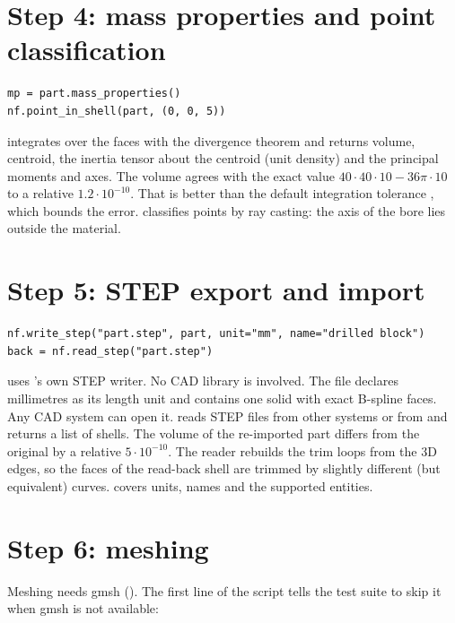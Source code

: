 \section{Step 4: mass properties and point classification}\label{sec:qs-mass}

\begin{lstlisting}
mp = part.mass_properties()
nf.point_in_shell(part, (0, 0, 5))
\end{lstlisting}

 integrates over the faces with the divergence theorem and returns
volume, centroid, the inertia tensor about the centroid (unit density) and the principal moments
and axes. The volume agrees with the exact value $40\cdot40\cdot10 - 36\pi\cdot 10$ to a relative
$1.2\cdot10^{-10}$. That is better than the default integration tolerance ,
which bounds the error.  classifies points by ray casting: the axis of
the bore lies outside the material.

\section{Step 5: STEP export and import}\label{sec:qs-step}

\begin{lstlisting}
nf.write_step("part.step", part, unit="mm", name="drilled block")
back = nf.read_step("part.step")
\end{lstlisting}

 uses \NF{}'s own STEP writer. No CAD library is involved. The file declares
millimetres as its length unit and contains one solid with exact B-spline faces. Any CAD system
can open it.  reads STEP files from other systems or from \NF{} and returns a
list of shells. The volume of the re-imported part differs from the original by a relative
$5\cdot10^{-10}$. The reader rebuilds the trim loops from the 3D edges, so the faces of the
read-back shell are trimmed by slightly different (but equivalent) curves.  covers units, names and the supported entities.

\section{Step 6: meshing}\label{sec:qs-mesh}

Meshing needs gmsh (). The first line of the script tells
the test suite to skip it when gmsh is not available:

